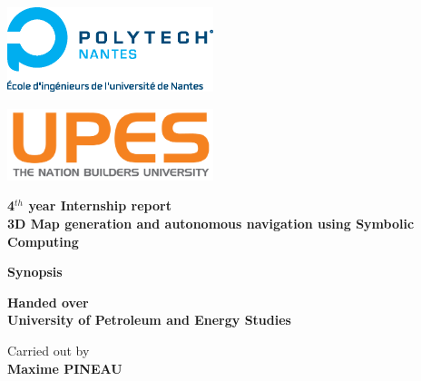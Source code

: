 
\begin{titlepage}	%

\begin{center}


\begin{minipage}[t]{0.48\textwidth}
	\begin{flushleft}
		\includegraphics [width=60mm]{images/logo_ecoles/Polytech_Nantes_Universite} \\[0.5cm]
	\end{flushleft}
\end{minipage}
\begin{minipage}[t]{0.48\textwidth}
	\begin{flushright}
		\includegraphics [width=60mm]{images/upes} \\[0.5cm]
	\end{flushright}
\end{minipage} 

\vfill

\Huge{\textbf{4$^{th}$ year Internship report}} \\
\huge{\textbf{3D Map generation and autonomous navigation using Symbolic Computing}}

\vfill 

\Large{\textbf{Synopsis}} 

\vfill

\Large{\textbf{Handed over}} \\
\LARGE{\textbf{University of Petroleum and Energy Studies}}

\vfill 

\Large{Carried out by} \\
\Large{\textbf{Maxime PINEAU}} 

\vfill 


\end{center}
\end{titlepage}
